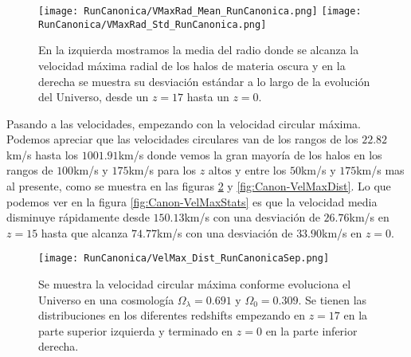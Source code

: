 \begin{figure}[H]
    \centering
    \texttt{[image: RunCanonica/VMaxRad\_Mean\_RunCanonica.png]}
    \texttt{[image: RunCanonica/VMaxRad\_Std\_RunCanonica.png]}
    \caption[Media y desviación estándar del Radio donde se alcanza la velocidad máxima radial]{\footnotesize En la izquierda mostramos la media del radio donde se alcanza la velocidad máxima radial de los halos de materia oscura y en la derecha se muestra su desviación estándar a lo largo de la evolución del Universo, desde un $z=17$ hasta un $z=0$.}
    \label{fig:Canon-VMaxRadStats}
\end{figure}

Pasando a las velocidades, empezando con la velocidad circular máxima. Podemos apreciar que las velocidades circulares van de los rangos de los $22.82$km/s hasta los $1001.91$km/s donde vemos la gran mayoría de los halos en los rangos de $100$km/s y $175$km/s para los $z$ altos y entre los $50$km/s y $175$km/s mas al presente, como se muestra en las figuras \ref{fig:Canon-VelMaxDistSep} y \ref{fig:Canon-VelMaxDist}. Lo que podemos ver en la figura \ref{fig:Canon-VelMaxStats} es que la velocidad  media disminuye rápidamente desde $150.13$km/s con una desviación de $26.76$km/s en $z=15$ hasta que alcanza $74.77$km/s con una desviación de $33.90$km/s en $z=0$.


\begin{figure}[H]
    \centering
    \texttt{[image: RunCanonica/VelMax\_Dist\_RunCanonicaSep.png]}
    \caption[Velocidad circular máxima]{\footnotesize Se muestra la velocidad circular máxima conforme evoluciona el Universo en una cosmología $\Omega_\lambda = 0.691 $ y $\Omega_0 = 0.309$. Se tienen las distribuciones en los diferentes redshifts empezando en $z=17$ en la parte superior izquierda y terminado en $z=0$ en la parte inferior derecha.}
    \label{fig:Canon-VelMaxDistSep}
\end{figure}

